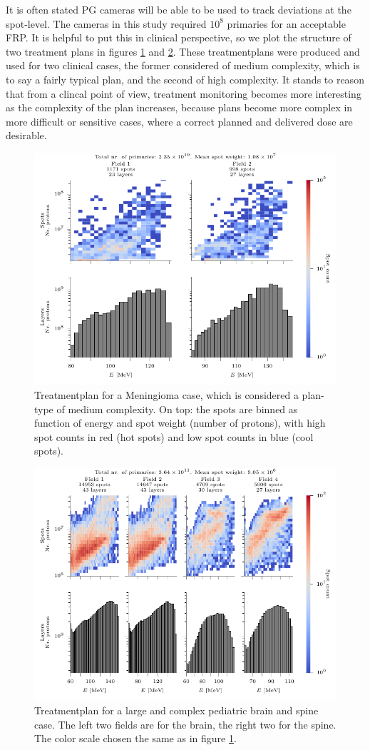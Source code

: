 \documentclass[a4paper,english,12pt]{article}
\begin{document}
It is often stated PG cameras will be able to be used to track deviations at the spot-level. The cameras in this study required $10^8$ primaries for an acceptable FRP. It is helpful to put this in clinical perspective, so we plot the structure of two treatment plans in figures \ref{fig:planmid} and \ref{fig:planhigh}. These treatmentplans were produced and used for two clinical cases, the former considered of medium complexity, which is to say a fairly typical plan, and the second of high complexity. It stands to reason that from a clincal point of view, treatment monitoring becomes more interesting as the complexity of the plan increases, because plans become more complex in more difficult or sensitive cases, where a correct planned and delivered dose are desirable.

\begin{figure}[htp]
  \centering
  \includegraphics[width=0.8\linewidth]{MENINGIOMA_F1nonorm-plot}
  \caption{Treatmentplan for a Meningioma case, which is considered a plan-type of medium complexity. On top: the spots are binned as function of energy and spot weight (number of protons), with high spot counts in red (hot spots) and low spot counts in blue (cool spots).}
  \label{fig:planmid}
\end{figure}

\begin{figure}[htp]
  \centering
  \includegraphics[width=0.8\linewidth]{CSI_F1nonorm-plot}
  \caption{Treatmentplan for a large and complex pediatric brain and spine case. The left two fields are for the brain, the right two for the spine. The color scale chosen the same as in figure \ref{fig:planmid}.}
  \label{fig:planhigh}
\end{figure}
\end{document}
